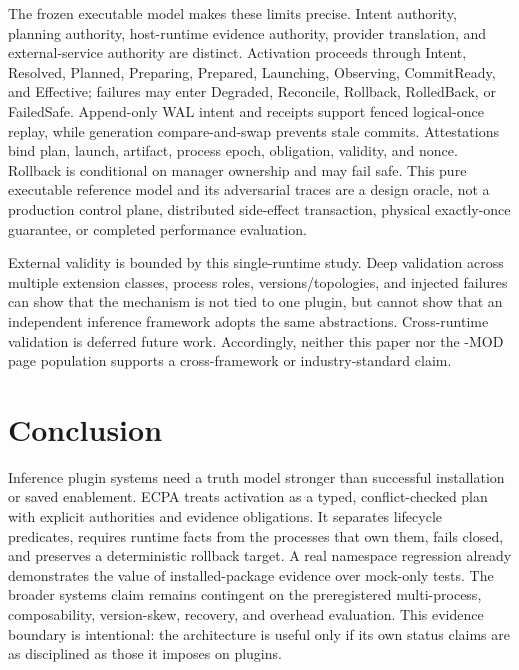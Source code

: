 \documentclass[letterpaper,twocolumn,10pt]{article}
\newcommand{\system}{\textsc{ECPA}\xspace}
\begin{document}
The frozen executable model makes these limits precise.  Intent authority,
planning authority, host-runtime evidence authority, provider translation,
and external-service authority are distinct.  Activation proceeds through
Intent, Resolved, Planned, Preparing, Prepared, Launching, Observing,
CommitReady, and Effective; failures may enter Degraded, Reconcile, Rollback,
RolledBack, or FailedSafe.  Append-only WAL intent and receipts support fenced
logical-once replay, while generation compare-and-swap prevents stale commits.
Attestations bind plan, launch, artifact, process epoch, obligation, validity,
and nonce.  Rollback is conditional on manager ownership and may fail safe.
This pure executable reference model and its adversarial traces are a design
oracle, not a production control plane, distributed side-effect transaction,
physical exactly-once guarantee, or completed performance evaluation.

External validity is bounded by this single-runtime study.  Deep validation
across multiple extension classes, process roles, versions/topologies, and injected
failures can show that the mechanism is not tied to one plugin, but cannot show
that an independent inference framework adopts the same abstractions.
Cross-runtime validation is deferred future work.  Accordingly, neither this
paper nor the \ECPAWorkshopMods{}-MOD page population
supports a cross-framework or industry-standard claim.

\section{Conclusion}
Inference plugin systems need a truth model stronger than successful
installation or saved enablement.  \system treats activation as a typed,
conflict-checked plan with explicit authorities and evidence obligations.  It
separates lifecycle predicates, requires runtime facts from the processes that
own them, fails closed, and preserves a deterministic rollback target.  A real
namespace regression already demonstrates the value of installed-package
evidence over mock-only tests.  The broader systems claim remains contingent on
the preregistered multi-process, composability, version-skew, recovery, and
overhead evaluation.  This evidence boundary is intentional: the architecture
is useful only if its own status claims are as disciplined as those it imposes
on plugins.



\end{document}
